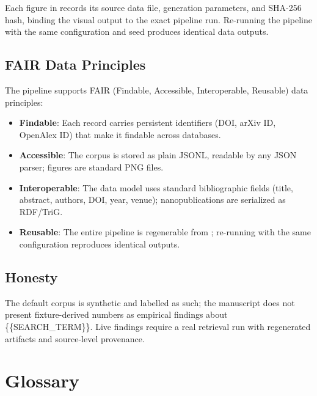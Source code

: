 \documentclass[
]{article}
\providecommand{\tightlist}{%
  \setlength{\itemsep}{0pt}\setlength{\parskip}{0pt}}
\begin{document}
Each figure in  records its source data
file, generation parameters, and SHA-256 hash, binding the visual output
to the exact pipeline run. Re-running the pipeline with the same
configuration and seed produces identical data outputs.

\subsection{FAIR Data Principles}\label{fair-data-principles}

The pipeline supports FAIR (Findable, Accessible, Interoperable,
Reusable) data principles:

\begin{itemize}
\tightlist
\item
  \textbf{Findable}: Each record carries persistent identifiers (DOI,
  arXiv ID, OpenAlex ID) that make it findable across databases.
\item
  \textbf{Accessible}: The corpus is stored as plain JSONL, readable by
  any JSON parser; figures are standard PNG files.
\item
  \textbf{Interoperable}: The data model uses standard bibliographic
  fields (title, abstract, authors, DOI, year, venue); nanopublications
  are serialized as RDF/TriG.
\item
  \textbf{Reusable}: The entire pipeline is regenerable from
  ; re-running with the same
  configuration reproduces identical outputs.
\end{itemize}

\subsection{Honesty}\label{honesty}

The default corpus is synthetic and labelled as such; the manuscript
does not present fixture-derived numbers as empirical findings about
\{\{SEARCH\_TERM\}\}. Live findings require a real retrieval run with
regenerated artifacts and source-level provenance.

\newpage

\section{Glossary}\label{glossary}
\end{document}
